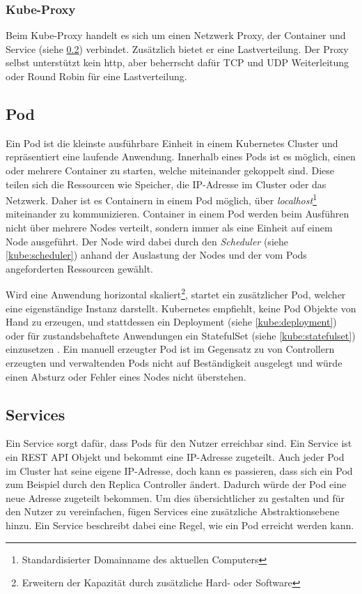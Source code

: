\subsubsection{Kube-Proxy}
Beim Kube-Proxy handelt es sich um einen Netzwerk Proxy, der Container und Service (siehe \ref{kube:service}) verbindet. Zusätzlich bietet er eine Lastverteilung. Der Proxy selbst unterstützt kein http, aber beherrscht dafür TCP und UDP Weiterleitung oder Round Robin für eine Lastverteilung.

\subsection{Pod}
\label{kube:pod}
Ein Pod ist die kleinste ausführbare Einheit in einem Kubernetes Cluster und repräsentiert eine laufende Anwendung. Innerhalb eines Pods ist es möglich, einen oder mehrere Container zu starten, welche miteinander gekoppelt sind. Diese teilen sich die Ressourcen wie Speicher, die IP-Adresse im Cluster oder das Netzwerk. Daher ist es Containern in einem Pod möglich, über \textit{localhost}\footnote{\label{foot:localhost}Standardisierter Domainname des aktuellen Computers} miteinander zu kommunizieren. Container in einem Pod werden beim Ausführen nicht über mehrere Nodes verteilt, sondern immer als eine Einheit auf einem Node ausgeführt. Der Node wird dabei durch den \textit{Scheduler} (siehe \ref{kube:scheduler}) anhand der Auslastung der Nodes und der vom Pods angeforderten Ressourcen gewählt.  \medskip

Wird eine Anwendung horizontal skaliert\footnote{\label{foot:scaleout}Erweitern der Kapazität durch zusätzliche Hard- oder Software}, startet ein zusätzlicher Pod, welcher eine eigenständige Instanz darstellt. Kubernetes empfiehlt, keine Pod Objekte von Hand zu erzeugen, und stattdessen ein Deployment (siehe \ref{kube:deployment}) oder für zustandsbehaftete Anwendungen ein StatefulSet (siehe \ref{kube:statefulset}) einzusetzen \cite{kube:pod2}. Ein manuell erzeugter Pod ist im Gegensatz zu von Controllern erzeugten und verwaltenden Pods nicht auf Beständigkeit ausgelegt und würde einen Absturz oder Fehler eines Nodes nicht überstehen.

\subsection{Services}
\label{kube:service}
Ein Service sorgt dafür, dass Pods für den Nutzer erreichbar sind. Ein Service ist ein REST API Objekt und bekommt eine IP-Adresse zugeteilt. Auch jeder Pod im Cluster hat seine eigene IP-Adresse, doch kann es passieren, dass sich ein Pod zum Beispiel durch den Replica Controller ändert. Dadurch würde der Pod eine neue Adresse zugeteilt bekommen. Um dies übersichtlicher zu gestalten und für den Nutzer zu vereinfachen, fügen Services eine zusätzliche Abstraktionsebene hinzu. Ein Service beschreibt dabei eine Regel, wie ein Pod erreicht werden kann. \medskip

